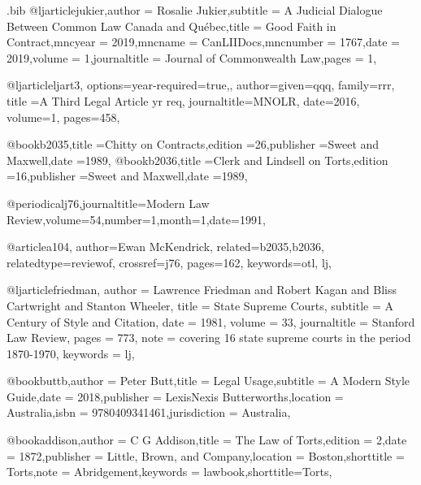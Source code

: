 \begin{filecontents*}[overwrite]{\jobname.bib}
@ljarticle{jukier,author = {Rosalie Jukier},subtitle = {A Judicial Dialogue Between Common Law Canada and Québec},title = {Good Faith in Contract},mncyear = {2019},mncname = {CanLIIDocs},mncnumber = {1767},date = {2019},volume = {1},journaltitle = {Journal of Commonwealth Law},pages = {1},}



@ljarticle{ljart3,
options={year-required=true,},
author={given=qqq, family=rrr},
title ={A Third Legal Article yr req},
journaltitle={MNOLR},
date={2016},
volume={1},
pages={458},
}

@book{b2035,title ={Chitty on Contracts},edition ={26},publisher ={Sweet and Maxwell},date ={1989},}
@book{b2036,title ={Clerk and Lindsell on Torts},edition ={16},publisher ={Sweet and Maxwell},date ={1989},}

@periodical{j76,journaltitle={Modern Law Review},volume={54},number={1},month={1},date={1991},}

@article{a104,
author={Ewan McKendrick},
related={b2035,b2036},
relatedtype={reviewof},
crossref={j76},
pages={162},
keywords={otl, lj},
}




@ljarticle{friedman,
author = {Lawrence Friedman and Robert Kagan and Bliss Cartwright and Stanton Wheeler},
title = {State Supreme Courts},
subtitle = {A Century of Style and Citation},
date = {1981},
volume = {33},
journaltitle = {Stanford Law Review},
pages = {773},
note = {covering 16 state supreme courts in the period 1870-1970},
keywords = {lj},
}




@book{buttb,author = {Peter Butt},title = {Legal Usage},subtitle = {A Modern Style Guide},date = {2018},publisher = {LexisNexis Butterworths},location = {Australia},isbn = {9780409341461},jurisdiction = {Australia},}

@book{addison,author = {C G Addison},title = {The Law of Torts},edition = {2},date = {1872},publisher = {Little, Brown, and Company},location = {Boston},shorttitle = {Torts},note = {Abridgement},keywords = {lawbook},shorttitle={Torts},}



\end{filecontents*}

